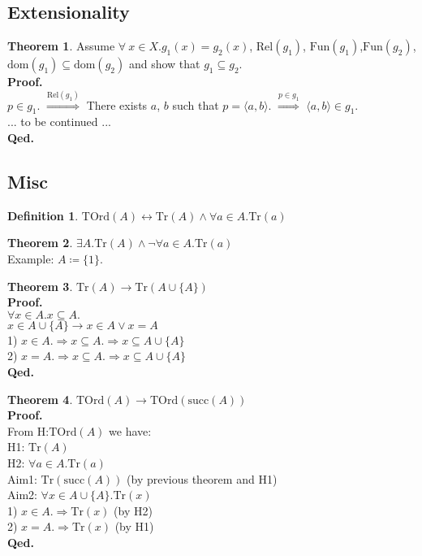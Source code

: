 \documentclass[10pt,a4paper]{article}
\theoremstyle{definition}
\newtheorem{definition}{Definition}[section]
\newtheorem{theorem}{Theorem}[section]
\newcommand{\Fun}{{\textrm{Fun}}}
\newcommand{\Rel}{{\textrm{Rel}}}
\newcommand{\dom}{{\textrm{dom}}}
\newcommand{\myprf}{\noindent\textbf{Proof.}}
\newcommand{\myqed}{\noindent\textbf{Qed.}}
\newcommand{\TOrd}{{\textrm{TOrd}}}
\newcommand{\Tr}{{\textrm{Tr}}}
\newcommand{\mysucc}{{\textrm{succ}}}
\begin{document}
\subsection{Extensionality}
\begin{theorem}
Assume $\forall~x\in X. g_1(x)=g_2(x)$, $\Rel(g_1)$, $\Fun(g_1)$,$\Fun(g_2)$,\\ $\dom(g_1)\subseteq\dom(g_2)$ and show that $g_1\subseteq g_2$.\\
\myprf\\
$p\in g_1$.
$\stackrel{\Rel(g_1)}{\Longrightarrow}$
There exists $a$, $b$ such that $p=\langle a, b\rangle$.
$\stackrel{p\in g_1}{\Longrightarrow}$ $\langle a, b\rangle\in g_1$.
\\
... to be continued ...
\\\myqed 
\end{theorem}
\subsection{Misc}
\begin{definition}
$\TOrd(A) \longleftrightarrow \Tr(A)\land \forall a\in A. \Tr(a)$
\end{definition}
\begin{theorem}
$\exists A. \Tr(A) \land \neg \forall a\in A. \Tr(a)$
\\Example: $A\coloneqq \{1\}$.
\end{theorem}
\begin{theorem}
$\Tr(A) \longrightarrow \Tr(A\cup\{A\})$
\\\myprf
\\$\forall x\in A.x\subseteq A.$
\\$x\in A\cup\{A\} \longrightarrow x\in A \lor x=A$
\\1) $x\in A. \Longrightarrow x\subseteq A. \Longrightarrow x\subseteq A\cup\{A\}$
\\2) $x = A. \Longrightarrow x\subseteq A. \Longrightarrow x\subseteq A\cup\{A\}$
\\\myqed
\end{theorem}
\begin{theorem}
  $ \TOrd(A) \longrightarrow \TOrd(\mysucc(A))$
\\\myprf
\\From H:$\TOrd(A)$ we have:
\\H1: $\Tr(A)$
\\H2: $\forall a\in A. \Tr(a)$
\\Aim1: $\Tr(\mysucc(A))$ (by previous theorem and H1)
\\Aim2: $\forall x\in A\cup\{A\}. \Tr(x)$
\\1) $x\in A. \Longrightarrow \Tr(x)$ (by H2)
\\2) $x = A. \Longrightarrow \Tr(x)$ (by H1) %
\\\myqed
\end{theorem}
\end{document}
